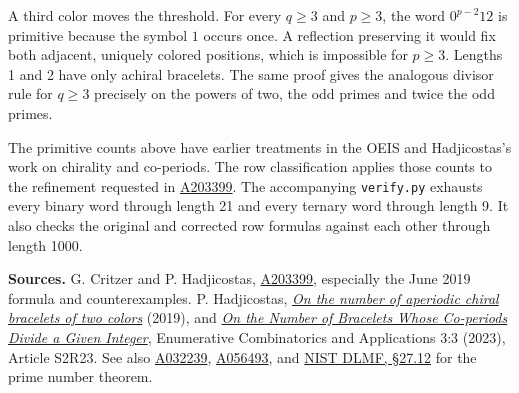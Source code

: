 \documentclass[11pt,letterpaper]{article}
\newcommand{\oeis}[1]{\href{https://oeis.org/A#1}{A#1}}
\begin{document}
A third color moves the threshold. For every $q\ge3$ and $p\ge3$, the word $0^{p-2}12$ is primitive because the symbol $1$ occurs once. A reflection preserving it would fix both adjacent, uniquely colored positions, which is impossible for $p\ge3$. Lengths 1 and 2 have only achiral bracelets. The same proof gives the analogous divisor rule for $q\ge3$ precisely on the powers of two, the odd primes and twice the odd primes.

The primitive counts above have earlier treatments in the OEIS and Hadjicostas's work on chirality and co-periods. The row classification applies those counts to the refinement requested in \oeis{203399}. The accompanying \texttt{verify.py} exhausts every binary word through length 21 and every ternary word through length 9. It also checks the original and corrected row formulas against each other through length 1000.

\smallskip
{\small
\noindent\textbf{Sources.}
G. Critzer and P. Hadjicostas, \oeis{203399}, especially the June 2019 formula and counterexamples.
P. Hadjicostas, \href{https://oeis.org/A203399/a203399.pdf}{\emph{On the number of aperiodic chiral bracelets of two colors}} (2019), and \href{https://doi.org/10.54550/ECA2023V3S3R23}{\emph{On the Number of Bracelets Whose Co-periods Divide a Given Integer}}, Enumerative Combinatorics and Applications 3:3 (2023), Article S2R23.
See also \oeis{032239}, \oeis{056493}, and \href{https://dlmf.nist.gov/27.12}{NIST DLMF, \S27.12} for the prime number theorem.}
\end{document}
